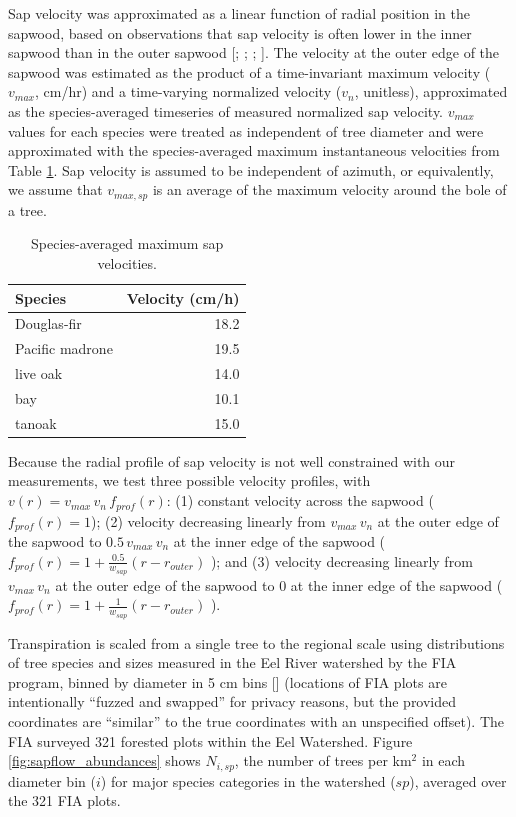 Sap velocity was approximated as a linear function of radial position in the sapwood, based on observations that sap velocity is often lower in the inner sapwood than in the outer sapwood [\cite{ford2004assessing}; \cite{cohen1985determination}; \cite{vcermak1992radial}; \cite{nadezhdina2002radial}].  The velocity at the outer edge of the sapwood was estimated as the product of a time-invariant maximum velocity ($v_{max}$, cm/hr) and a time-varying normalized velocity ($v_n$, unitless), approximated as the species-averaged timeseries of measured normalized sap velocity.  $v_{max}$ values for each species were treated as independent of tree diameter and were approximated with the species-averaged maximum instantaneous velocities from Table \ref{tbl:sapflow_maxvel}.  Sap velocity is assumed to be independent of azimuth, or equivalently, we assume that $v_{max,sp}$ is an average of the maximum velocity around the bole of a tree.

\begin{table}
  \caption{Species-averaged maximum sap velocities.}
  \label{tbl:sapflow_maxvel}
  \begin{tabular}{l r}
  \hline
  Species & Velocity (cm/h) \\
  \hline
  Douglas-fir & 18.2 \\
  Pacific madrone & 19.5 \\
  live oak & 14.0 \\
  bay & 10.1 \\
  tanoak & 15.0 \\
  \hline
  \end{tabular}
\end{table}

Because the radial profile of sap velocity is not well constrained with our measurements, we test three possible velocity profiles, with $v(r) = v_{max} \, v_n \, f_{prof}(r)$: (1) constant velocity across the sapwood ($f_{prof}(r) = 1$); (2) velocity decreasing linearly from $v_{max} \, v_n$ at the outer edge of the sapwood to $0.5 \, v_{max} \, v_n$ at the inner edge of the sapwood ($f_{prof}(r) = 1+\tfrac{0.5}{w_{sap}}(r-r_{outer})$ ); and (3) velocity decreasing linearly from $v_{max} \, v_n$ at the outer edge of the sapwood to 0 at the inner edge of the sapwood ($f_{prof}(r) = 1+\tfrac{1}{w_{sap}}(r-r_{outer})$ ).

Transpiration is scaled from a single tree to the regional scale using distributions of tree species and sizes measured in the Eel River watershed by the FIA program, binned by diameter in 5 cm bins [\cite{woudenberg2010forest}] (locations of FIA plots are intentionally ``fuzzed and swapped'' for privacy reasons, but the provided coordinates are ``similar'' to the true coordinates with an unspecified offset).  The FIA surveyed 321 forested plots within the Eel Watershed.  Figure \ref{fig:sapflow_abundances} shows $N_{i,sp}$, the number of trees per km$^2$ in each diameter bin ($i$) for major species categories in the watershed ($sp$), averaged over the 321 FIA plots.

